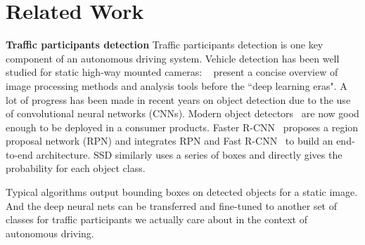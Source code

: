\documentclass[10pt,twocolumn,letterpaper]{article}
\begin{document}
\section{Related Work}

\noindent \textbf{Traffic participants detection} Traffic participants detection is one key component of an autonomous driving system. Vehicle detection has been well studied for static high-way mounted cameras: ~\cite{hadi2014vehicle} present a concise overview of image processing methods and analysis tools before the ``deep learning eras".
A lot of progress has been made in recent years on object detection due to the use of convolutional neural networks (CNNs).
Modern object detectors~\cite{girshick2014rich, Girshick2015Fast, ren2015faster_nips, He2015Spatial, he2017mask, redmon2016you, liu2016ssd} are now good enough to be deployed in a consumer products. Faster R-CNN~\cite{ren2015faster_nips} proposes a region proposal network (RPN) and integrates RPN and Fast R-CNN~\cite{Girshick2015Fast} to build an end-to-end architecture. SSD \cite{liu2016ssd} similarly uses a series of boxes and directly gives the probability for each object class.

Typical algorithms output bounding boxes on detected objects for a static image. And the deep neural nets can be transferred and fine-tuned to another set of classes for traffic participants  we actually care about in the context of autonomous driving.
\end{document}
